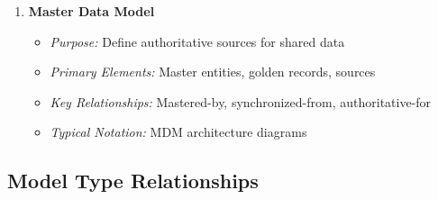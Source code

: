 \documentclass[11pt,letterpaper]{article}
\begin{document}
\begin{enumerate}[label=\textbf{MT\arabic*:}, leftmargin=2.5em]
    \item \textbf{Master Data Model}
    \begin{itemize}[nosep]
        \item \textit{Purpose:} Define authoritative sources for shared data
        \item \textit{Primary Elements:} Master entities, golden records, sources
        \item \textit{Key Relationships:} Mastered-by, synchronized-from, authoritative-for
        \item \textit{Typical Notation:} MDM architecture diagrams
    \end{itemize}
\end{enumerate}

\subsection{Model Type Relationships}
\end{document}
